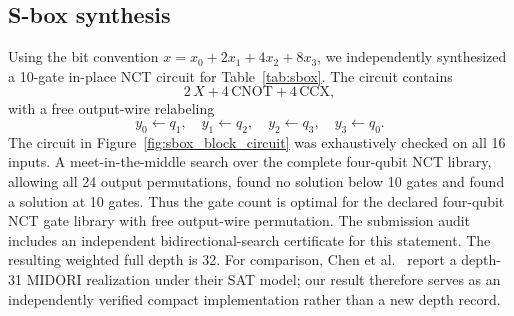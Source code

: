 \documentclass[10pt,a4paper]{article}
\begin{document}
\subsection{S-box synthesis}
Using the bit convention $x=x_0+2x_1+4x_2+8x_3$, we independently synthesized a 10-gate in-place NCT circuit for Table~\ref{tab:sbox}. The circuit contains
\begin{equation}
    2\,X + 4\,\mathrm{CNOT} + 4\,\mathrm{CCX},
\end{equation}
with a free output-wire relabeling
\begin{equation}
    y_0\leftarrow q_1,\quad y_1\leftarrow q_2,\quad y_2\leftarrow q_3,\quad y_3\leftarrow q_0.
\end{equation}
The circuit in Figure~\ref{fig:sbox_block_circuit} was exhaustively checked on all 16 inputs. A meet-in-the-middle search over the complete four-qubit NCT library, allowing all 24 output permutations, found no solution below 10 gates and found a solution at 10 gates. Thus the gate count is optimal for the declared four-qubit NCT gate library with free output-wire permutation. The submission audit includes an independent bidirectional-search certificate for this statement. The resulting weighted full depth is 32. For comparison, Chen et al.~\cite{Chen2024} report a depth-31 MIDORI realization under their SAT model; our result therefore serves as an independently verified compact implementation rather than a new depth record.
\end{document}
